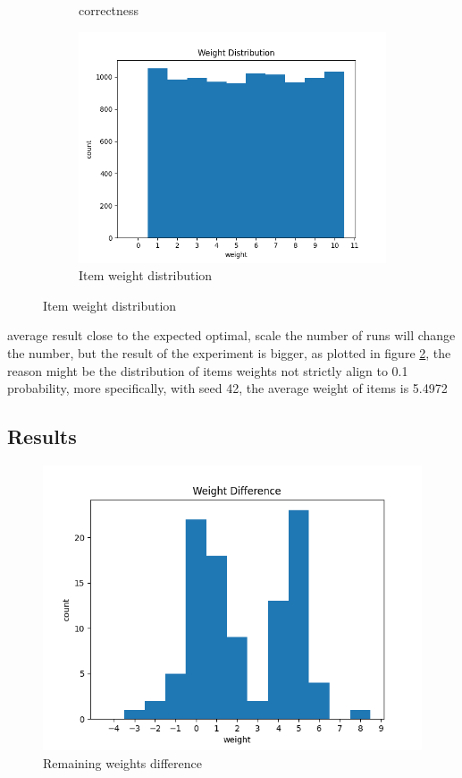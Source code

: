 \begin{figure}[htbp]
\begin{subfigure}[htbp]{0.33\textwidth}
        \caption{correctness}
        \label{fig:fig_2}
    \end{subfigure}
    \hfill
    \begin{subfigure}[htbp]{0.33\textwidth}
        \centering
        \includegraphics[width=\textwidth]{fig/asg1_weight_dist.png}
        \caption{Item weight distribution}
        \label{fig:weightdist}
    \end{subfigure}
    \label{fig:gain}
\end{figure}

average result close to the expected optimal, scale the number of runs will change the number, but the result of the experiment is bigger, as plotted in figure \ref{fig:weightdist}, the reason might be the distribution of items weights not strictly align to 0.1 probability, more specifically, with seed 42, the average weight of items is 5.4972 
\subsection{Results}
\begin{figure}[htbp]
    \centering
    \includegraphics[width=0.8\linewidth]{fig/asg1_weight_diff.png}
    \caption {Remaining weights difference}
    \label{fig:gain}
\end{figure}



